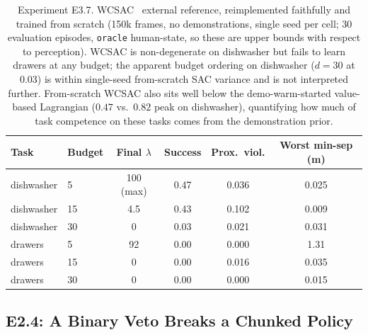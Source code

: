 \documentclass[11pt,a4paper]{report}
\begin{document}
\begin{table}[htbp]
\centering
\small
\caption{Experiment E3.7. WCSAC~\cite{yang2021wcsac} external
reference, reimplemented faithfully and trained from scratch (150k
frames, no demonstrations, single seed per cell; 30 evaluation
episodes, \texttt{oracle} human-state, so these are upper bounds with
respect to perception). WCSAC is non-degenerate on dishwasher but
fails to learn drawers at any budget; the apparent budget ordering on
dishwasher ($d{=}30$ at $0.03$) is within single-seed from-scratch
SAC variance and is not interpreted further. From-scratch WCSAC also
sits well below the demo-warm-started value-based Lagrangian
($0.47$ vs.\ $0.82$ peak on dishwasher), quantifying how much of
task competence on these tasks comes from the demonstration prior.}
\label{tab:e3.7-wcsac}
\begin{tabular}{llcccc}
\toprule
Task & Budget & Final $\lambda$ & Success & Prox.\ viol. & Worst min-sep (m) \\
\midrule
dishwasher & 5  & 100 (max) & 0.47 & 0.036 & 0.025 \\
dishwasher & 15 & 4.5       & 0.43 & 0.102 & 0.009 \\
dishwasher & 30 & 0         & 0.03 & 0.021 & 0.031 \\
drawers    & 5  & 92        & 0.00 & 0.000 & 1.31 \\
drawers    & 15 & 0         & 0.00 & 0.016 & 0.035 \\
drawers    & 30 & 0         & 0.00 & 0.000 & 0.015 \\
\bottomrule
\end{tabular}
\end{table}

\subsection{E2.4: A Binary Veto Breaks a Chunked Policy}
\label{sec:results:r2-veto}
\end{document}
